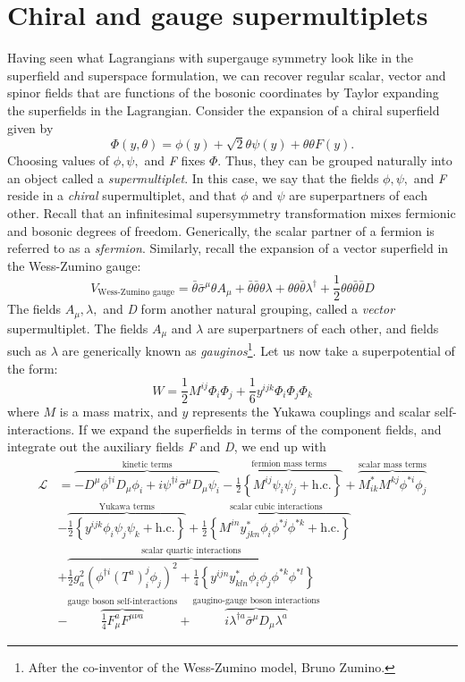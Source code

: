 \section{Chiral and gauge supermultiplets}
Having seen what Lagrangians with supergauge symmetry look like in the superfield and superspace formulation, we can recover regular scalar, vector and spinor fields that are functions of the bosonic coordinates by Taylor expanding the superfields in the Lagrangian. Consider the expansion of a chiral superfield given by
\[\Phi(y,\theta) = \phi(y) + \sqrt{2}\theta\psi(y)+\theta\theta F(y).\]
Choosing values of $\phi,\psi,$ and \emph{F} fixes $\Phi$. Thus, they can be grouped naturally into an object called a \emph{supermultiplet}. In this case, we say that the fields $\phi,\psi,$ and \emph{F} reside in a \emph{chiral} supermultiplet, and that $\phi$ and $\psi$ are superpartners of each other. Recall that an infinitesimal supersymmetry transformation mixes fermionic and bosonic degrees of freedom. Generically, the scalar partner of a fermion is referred to as a \emph{sfermion}. Similarly, recall the expansion of a vector superfield in the Wess-Zumino gauge:
\[V_\text{Wess-Zumino gauge} = \bar{\theta}\bar{\sigma}^\mu\theta A_\mu+\bar{\theta}\bar{\theta}\theta\lambda+\theta\theta\bar{\theta}\lambda^\dagger+\frac{1}{2}\theta\theta\bar{\theta}\bar{\theta}D\]
The fields $A_\mu,\lambda,$ and \emph{D} form another natural grouping, called a \emph{vector} supermultiplet. The fields $A_\mu$ and $\lambda$ are superpartners of each other, and fields such as $\lambda$ are generically known as \emph{gauginos}\footnote{After the co-inventor of the Wess-Zumino model, Bruno Zumino.}.
Let us now take a superpotential of the form:
\begin{equation}
W = \frac{1}{2}M^{ij}\Phi_i\Phi_j + \frac{1}{6}y^{ijk}\Phi_i\Phi_j\Phi_k
\label{eq:superpotential}
\end{equation}
where $M$ is a mass matrix, and $y$ represents the Yukawa couplings and scalar self-interactions.
If we expand the superfields in terms of the component fields, and integrate out the auxiliary fields \emph{F} and \emph{D}, we end up with
\begin{align*}
  \mathcal{L} &= \overbrace{-D^\mu\phi^{\dagger i}D_\mu\phi_i + i\psi^{\dagger i}\bar{\sigma}^\mu D_\mu\psi_i}^\text{kinetic terms}
  -\overbrace{\frac{1}{2}\left\{M^{ij}\psi_i\psi_j+\text{h.c.}\right\}}^{\text{fermion mass terms}}
   +\overbrace{M_{ik}^*M^{kj}\phi^{*i}\phi_j}^\text{scalar mass terms}\\
  &-\overbrace{\frac{1}{2}\left\{y^{ijk}\phi_i\psi_j\psi_k+\text{h.c.}\right\}}^{\text{Yukawa terms}}
  +\overbrace{\frac{1}{2}\left\{M^{in}y_{jkn}^*\phi_i\phi^{*j}\phi^{*k}+\text{h.c.}\right\}}^\text{scalar cubic interactions}\\
  &+\overbrace{\frac{1}{2}g_a^2(\phi^{\dagger i}(T^a)_i^j\phi_j)^2+\frac{1}{4}\left\{y^{ijn}y_{kln}^*\phi_i\phi_j\phi^{*k}\phi^{*l}\right\}}^\text{scalar quartic interactions}\\
  &-\overbrace{\frac{1}{4}F_{\mu}^aF^{\mu\nu a}}^\text{gauge boson self-interactions}
  +\overbrace{i\lambda^{\dagger a}\bar{\sigma}^\mu D_\mu\lambda^a}^\text{gaugino-gauge boson interactions}
\end{align*}


